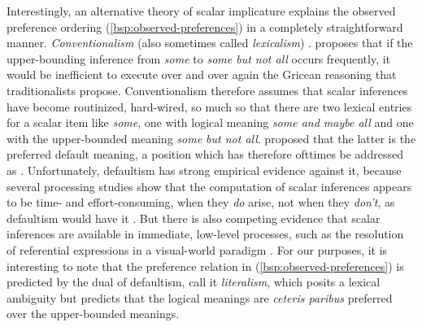 \documentclass[fleqn,reqno,10pt,draft]{article}
\begin{document}

Interestingly, an alternative theory of scalar implicature explains the 
observed preference ordering (\ref{bsp:observed-preferences})
in a completely straightforward manner. 
\emph{Conventionalism} (also sometimes called \emph{lexicalism})
\citep[e.g.][]{LevinsonPresumptiveMeanings2000,Chierchia:2004_ScalarImplicatures}.
proposes that if the upper-bounding inference from
\emph{some} to \emph{some but not all} occurs frequently, it
would be inefficient to execute over and over again the Gricean
reasoning that traditionalists propose. Conventionalism therefore
assumes that scalar inferences have become routinized, hard-wired, so
much so that there are two lexical entries for a scalar item like
\emph{some}, one with logical meaning \emph{some and maybe all} and
one with the upper-bounded meaning \emph{some but not
  all}. \citet{LevinsonPresumptiveMeanings2000} proposed that the
latter is the preferred default meaning, a position which has
therefore ofttimes be addressed as . Unfortunately,
defaultism has strong empirical evidence against it, because several
processing studies show that the computation of scalar inferences
appears to be time- and effort-consuming, when they \emph{do} arise,
not when they \emph{don't}, as defaultism would have it
\citep[c.f.][]{BrehenyKatsos2006:Are-Generalised,BrehenyKatsos2008:Experimental-In,NeysDe-NeysSchaeken2007:When-People-Are}. But
there is also competing evidence that scalar inferences are available
in immediate, low-level processes, such as the resolution of
referential expressions in a visual-world paradigm
\citep{GrodnerKlein2010:Some-and-Possib}. For our purposes, it is
interesting to note that the preference relation in
(\ref{bsp:observed-preferences}) is predicted by the dual of
defaultism, call it \emph{literalism}, which posits a lexical
ambiguity but predicts that the logical meanings are \emph{ceteris
  paribus} preferred over the upper-bounded meanings.
\end{document}
